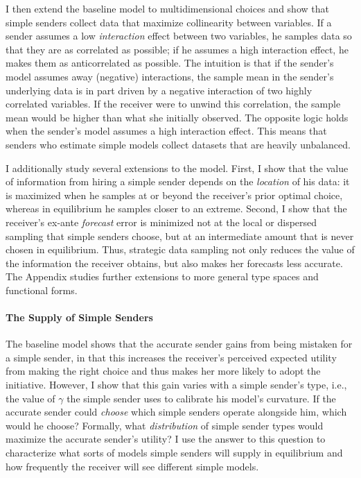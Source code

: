 \documentclass[11pt,dvipsnames]{article}
\begin{document}
I then extend the baseline model to multidimensional choices and show that simple senders collect data that maximize collinearity between variables.
If a sender assumes a low \emph{interaction} effect between two variables, he samples data so that they are as correlated as possible; if he assumes a high interaction effect, he makes them as anticorrelated as possible.
The intuition is that if the sender's model assumes away (negative) interactions, the sample mean in the sender's underlying data is in part driven by a negative interaction of two highly correlated variables.
If the receiver were to unwind this correlation, the sample mean would be higher than what she initially observed.
The opposite logic holds when the sender's model assumes a high interaction effect.
This means that senders who estimate simple models collect datasets that are heavily unbalanced.

I additionally study several extensions to the model.
First, I show that the value of information from hiring a simple sender depends on the \emph{location} of his data: it is maximized when he samples at or beyond the receiver's prior optimal choice, whereas in equilibrium he samples closer to an extreme.
Second, I show that the receiver's ex-ante \emph{forecast} error is minimized not at the local or dispersed sampling that simple senders choose, but at an intermediate amount that is never chosen in equilibrium.
Thus, strategic data sampling not only reduces the value of the information the receiver obtains, but also makes her forecasts less accurate.
The Appendix studies further extensions to more general type spaces and functional forms.


\paragraph{The Supply of Simple Senders}
The baseline model shows that the accurate sender gains from being mistaken for a simple sender, in that this increases the receiver's perceived expected utility from making the right choice and thus makes her more likely to adopt the initiative.
However, I show that this gain varies with a simple sender's type, i.e., the value of $\gamma$ the simple sender uses to calibrate his model's curvature.
If the accurate sender could \emph{choose} which simple senders operate alongside him, which would he choose?
Formally, what \emph{distribution} of simple sender types would maximize the accurate sender's utility?
I use the answer to this question to characterize what sorts of models simple senders will supply in equilibrium and how frequently the receiver will see different simple models.
\end{document}
